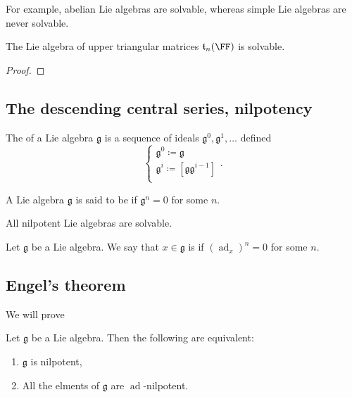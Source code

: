 \documentclass{article}
\newcommand{\lb}[1]{\ensuremath{\left[{#1}\right]}}
\DeclareMathOperator{\ad}{ad}
\newcommand{\frkg}{\ensuremath{\mathfrak{g}}}
\newcommand{\talg}{\ensuremath{\mathfrak{t}}}
\begin{document}
For example, abelian Lie algebras are solvable, whereas simple Lie algebras are never solvable.

\begin{proposition}
    The Lie algebra of upper triangular matrices $\talg_n(\FF)$ is solvable.
\end{proposition}
\begin{proof}
\end{proof}

\subsection{The descending central series, nilpotency}

\begin{definition}
    The  of a Lie algebra $\frkg$ is a sequence of ideals $\frkg^0, \frkg^1, \ldots$ defined
    \[
        \begin{cases}
            \frkg^0 \coloneq \frkg \\
            \frkg^i \coloneq \lb{\frkg\frkg^{i-1}} \\
        \end{cases}.
    \]
\end{definition}

\begin{definition}
    A Lie algebra $\frkg$ is said to be  if $\frkg^n = 0$ for some $n$.
\end{definition}

\begin{proposition}
    All nilpotent Lie algebras are solvable.
\end{proposition}

\begin{definition}
    Let $\frkg$ be a Lie algebra.
    We say that $x \in \frkg$ is  if $(\ad_x)^n = 0$ for some $n$.
\end{definition}

\subsection{Engel's theorem}

We will prove 

\begin{theorem}[Engel]
    Let $\frkg$ be a Lie algebra.
    Then the following are equivalent:
    \begin{enumerate}[label=(\roman*)]
        \item 
            $\frkg$ is nilpotent,
        \item 
            All the elments of $\frkg$ are $\ad$-nilpotent.
    \end{enumerate}
\end{theorem}
\end{document}
